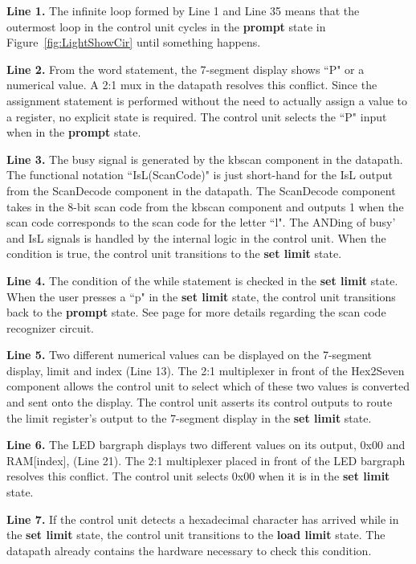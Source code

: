 {\bf Line 1.} The infinite loop formed by Line 1 and Line 35 means that the outermost loop 
in the control unit cycles in the {\bf prompt} state in Figure~\ref{fig:LightShowCir} 
until something happens.

{\bf Line 2.} From the word statement, the 7-segment display shows ``P" or a numerical value.
A 2:1 mux in the datapath resolves this conflict. Since the assignment statement
is performed without the need to actually assign a value to a register, no 
explicit state is required.  The control unit selects the ``P" input when in the 
{\bf prompt} state.  

{\bf Line 3.} The busy signal is generated by the kbscan component in the datapath.  
The functional notation ``IsL(ScanCode)" is just short-hand for the IsL output from 
the ScanDecode component in the datapath.  The ScanDecode component takes in the
8-bit scan code from the kbscan component and outputs 1 when the scan code corresponds
to the scan code for the letter ``l".  The ANDing of busy' and IsL signals is handled 
by the internal logic in the control unit.  When the condition is true, the control 
unit transitions to the {\bf set limit} state.

{\bf Line 4.} The condition of the while statement is checked in the {\bf set limit} 
state.  When the user presses a ``p" in the {\bf set limit} state, the control 
unit transitions back to the {\bf prompt} state.  See page \pageref{page:IsScan}
for more details regarding the scan code recognizer circuit.

{\bf Line 5.} Two different numerical values can be displayed on the 
7-segment display, limit and index (Line 13).  The 2:1 multiplexer in front of 
the Hex2Seven component allows the control unit to select which of these two values is 
converted and sent onto the display.  The control unit asserts its control 
outputs to route the limit register's output to the 7-segment display in 
the {\bf set limit} state.

{\bf Line 6.} The LED bargraph displays two different values on its output, 0x00 and 
RAM[index], (Line 21).  The 2:1 multiplexer placed in front of the LED bargraph 
resolves this conflict.  The control unit selects 0x00 when it is in the 
{\bf set limit} state.

{\bf Line 7.} If the control unit detects a hexadecimal character has arrived while 
in the {\bf set limit} state, the control unit transitions to the {\bf load 
limit} state.  The datapath already contains the hardware necessary to check 
this condition.


